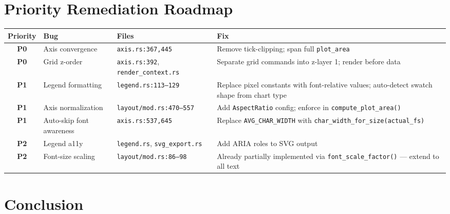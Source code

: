 \documentclass[11pt,a4paper]{article}
\begin{document}
\section{Priority Remediation Roadmap}

\begin{longtable}{c l l p{5cm}}
\toprule
\textbf{Priority} & \textbf{Bug} & \textbf{Files} & \textbf{Fix} \\
\midrule
\textcolor{criticalred}{\textbf{P0}} & Axis convergence
  & \texttt{axis.rs:367,445}
  & Remove tick-clipping; span full \texttt{plot\_area} \\[4pt]

\textcolor{criticalred}{\textbf{P0}} & Grid z-order
  & \texttt{axis.rs:392}, \texttt{render\_context.rs}
  & Separate grid commands into z-layer 1; render before data \\[4pt]

\textcolor{warningyellow}{\textbf{P1}} & Legend formatting
  & \texttt{legend.rs:113--129}
  & Replace pixel constants with font-relative values; auto-detect swatch shape from chart type \\[4pt]

\textcolor{warningyellow}{\textbf{P1}} & Axis normalization
  & \texttt{layout/mod.rs:470--557}
  & Add \texttt{AspectRatio} config; enforce in \texttt{compute\_plot\_area()} \\[4pt]

\textcolor{warningyellow}{\textbf{P1}} & Auto-skip font awareness
  & \texttt{axis.rs:537,645}
  & Replace \texttt{AVG\_CHAR\_WIDTH} with \texttt{char\_width\_for\_size(actual\_fs)} \\[4pt]

\textcolor{googblue}{\textbf{P2}} & Legend a11y
  & \texttt{legend.rs}, \texttt{svg\_export.rs}
  & Add ARIA roles to SVG output \\[4pt]

\textcolor{googblue}{\textbf{P2}} & Font-size scaling
  & \texttt{layout/mod.rs:86--98}
  & Already partially implemented via \texttt{font\_scale\_factor()} — extend to all text \\
\bottomrule
\end{longtable}

\section{Conclusion}
\end{document}
